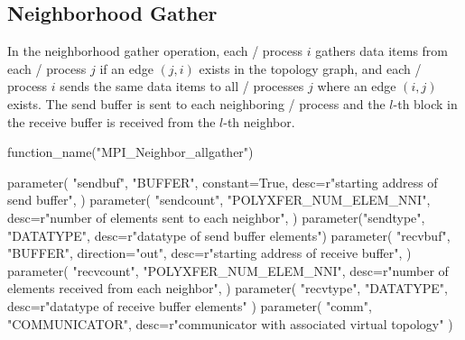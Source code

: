 \subsection{Neighborhood Gather}
\label{subsec:sparsecoll:allgather}

In the neighborhood gather operation, each \MPI/ process $i$ gathers data items from each \MPI/ process
$j$ if an edge $(j,i)$ exists in the topology graph, and each
\MPI/ process $i$ sends the same data items to all \MPI/ processes $j$ where an edge $(i,j)$
exists. The send buffer is sent to each neighboring \MPI/ process and the
$l$-th block in the receive buffer is received from the $l$-th neighbor.

\begin{mpi-binding}
    function_name("MPI_Neighbor_allgather")
    
    parameter(
        "sendbuf",
        "BUFFER",
        constant=True,
        desc=r"starting address of send buffer",
    )
    parameter(
        "sendcount",
        "POLYXFER_NUM_ELEM_NNI",
        desc=r"number of elements sent to each neighbor",
    )
    parameter("sendtype", "DATATYPE", desc=r"datatype of send buffer elements")
    parameter(
        "recvbuf",
        "BUFFER",
        direction="out",
        desc=r"starting address of receive buffer",
    )
    parameter(
        "recvcount",
        "POLYXFER_NUM_ELEM_NNI",
        desc=r"number of elements received from each neighbor",
    )
    parameter(
        "recvtype", "DATATYPE", desc=r"datatype of receive buffer elements"
    )
    parameter(
        "comm", "COMMUNICATOR", desc=r"communicator with associated virtual topology"
    )
\end{mpi-binding}

